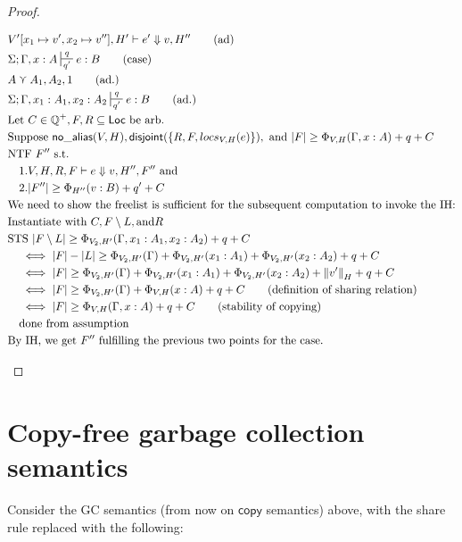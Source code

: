 \documentclass[sigconf]{acmart}
\newcommand{\ms}[1]{\ensuremath{\mathsf{#1}}}
\newcounter{rule}
\newcommand{\na}[1]{\mathsf{no\_alias}(#1)}
\newcommand{\dist}[1]{\mathsf{disjoint}(#1)}
\newcommand{\ssize}[2]{\left\Vert #2 \right\Vert_{#1}}
\theoremstyle{definition}
\begin{document}
\begin{proof}
\begin{description}
\begin{align*}
	&V'[x_1 \mapsto v',x_2 \mapsto v''], H' \vdash e' \Downarrow v,H'' \tag{ad}\\
	&\Sigma;\Gamma,x:A \sststile{q'}{q} e : B \tag{case}\\
	&A \curlyvee A_1,A_2,1 \tag{ad.}\\
	&\Sigma; \Gamma,x_1:A_1,x_2:A_2 \sststile{q'}{q} e : B \tag{ad.}\\
  &\text{Let } C \in \mathbb{Q}^+, F,R \subseteq \ms{Loc} \text{ be arb.}\\
  &\text{Suppose }  \na{V,H}, \dist{\{R,F,locs_{V,H}(e)\}}, \text{ and } |F| 
		\ge \Phi_{V,H}(\Gamma,x:A) + q + C\\
  &\text{NTF } F'' \text{ s.t. }\\
  &\quad 1. V,H,R,F \vdash e \Downarrow v, H'',F'' \text{ and }\\ 
  &\quad 2. |F''| \ge \Phi_{H''}(v:B) + q' + C\\
	&\text{We need to show the freelist is sufficient for the subsequent computation to invoke the IH:}\\
	&\text{Instantiate with } C, F \setminus L, \text{and} R\\
	&\text{STS } |F\setminus L| \ge \Phi_{V_2, H'}(\Gamma,x_1 : A_1,x_2 : A_2) + q + C\\
	&\quad \iff |F| - |L| \ge \Phi_{V_2,H'}(\Gamma) + 
			\Phi_{V_2,H'}(x_1 : A_1) + \Phi_{V_2,H'}(x_2 : A_2) + q + C\\
	&\quad \iff |F| \ge \Phi_{V_2,H'}(\Gamma) + 
			\Phi_{V_2,H'}(x_1 : A_1) + \Phi_{V_2,H'}(x_2 : A_2) + \ssize{H}{v'} + q + C\\
	&\quad \iff |F| \ge \Phi_{V_2,H'}(\Gamma) + 
			\Phi_{V,H}(x : A) + q + C \tag{definition of sharing relation}\\
	&\quad \iff |F| \ge \Phi_{V,H}(\Gamma,x:A) + q + C \tag{stability of copying}\\
	&\quad \text{done from assumption}\\
	&\text{By IH, we get } F'' \text{ fulfilling the previous two points for the case. }\\
	\end{align*}
  \end{description}
\end{proof}

\section{Copy-free garbage collection semantics}

Consider the GC semantics (from now on $\mathsf{copy}$ semantics) above,
with the share rule replaced with the following: 
\end{document}

